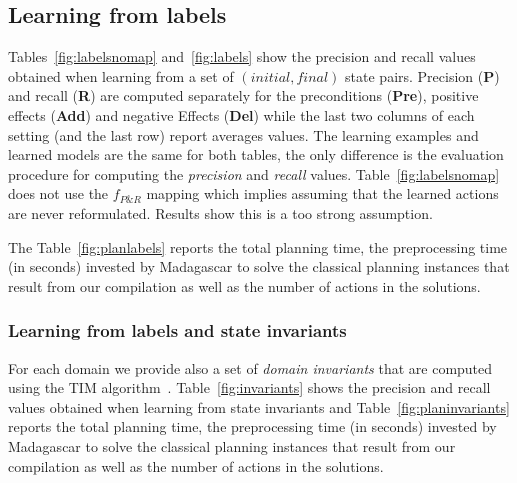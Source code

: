 \documentclass{article}
\begin{document}
\subsection{Learning from labels}
Tables~\ref{fig:labelsnomap} and~\ref{fig:labels} show the precision and recall values obtained when learning from a set of $(initial, final)$ state pairs. Precision ({\bf P}) and recall ({\bf R}) are computed separately for the preconditions ({\bf Pre}), positive effects ({\bf Add}) and negative Effects ({\bf Del}) while the last two columns of each setting (and the last row) report averages values. The learning examples and learned models are the same for both tables, the only difference is the evaluation procedure for computing the {\em precision} and {\em recall} values. Table~\ref{fig:labelsnomap} does not use the $f_{P\&R}$ mapping which implies assuming that the learned actions are never reformulated. Results show this is a too strong assumption. 

The Table~\ref{fig:planlabels} reports the total planning time, the preprocessing time (in seconds) invested by {\sc Madagascar} to solve the classical planning instances that result from our compilation as well as the number of actions in the solutions. 


\subsubsection{Learning from labels and state invariants}
For each domain we provide also a set of {\em domain invariants} that are computed using the {\sc TIM} algorithm~\cite{fox:TIM:JAIR1998}. Table~\ref{fig:invariants} shows the precision and recall values obtained when learning from state invariants and Table~\ref{fig:planinvariants} reports the total planning time, the preprocessing time (in seconds) invested by {\sc Madagascar} to solve the classical planning instances that result from our compilation as well as the number of actions in the solutions. 
\end{document}
